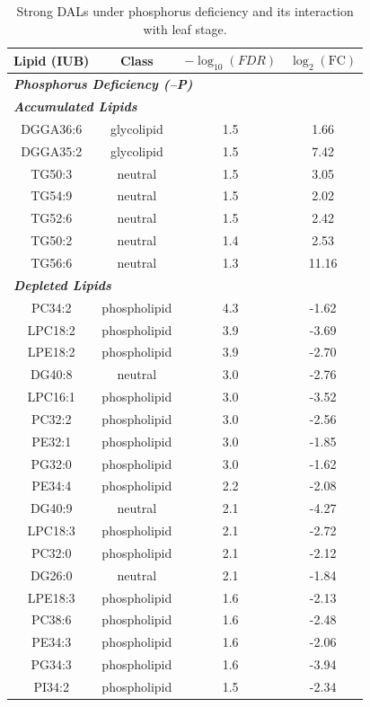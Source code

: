 \documentclass[9pt,twocolumn,twoside]{rilabRxiv}
\begin{document}
\begin{table}[h!]
\centering
\footnotesize
\caption{Strong DALs under phosphorus deficiency and its interaction with leaf stage.}
\label{table::phosphorus_lipids}
\begin{tabular}{cccc}
\hline
\textbf{Lipid (IUB)} & \textbf{Class} & \textbf{$-\log_{10}(\textit{FDR})$} & \textbf{$\log_2(\text{FC})$}\\
\hline
\multicolumn{4}{l}{\textit{\textbf{Phosphorus Deficiency (–P)}}} \\
\hline
\multicolumn{4}{l}{\textit{\textbf{Accumulated Lipids}}} \\
\hline
DGGA36:6 & glycolipid & 1.5 & 1.66\\
DGGA35:2 & glycolipid & 1.5 & 7.42\\
TG50:3 & neutral & 1.5 & 3.05\\
TG54:9 & neutral & 1.5 & 2.02\\
TG52:6 & neutral & 1.5 & 2.42\\
TG50:2 & neutral & 1.4 & 2.53\\
TG56:6 & neutral & 1.3 & 11.16\\
\hline
\multicolumn{4}{l}{\textit{\textbf{Depleted Lipids}}} \\
\hline
PC34:2 & phospholipid & 4.3 & -1.62\\
LPC18:2 & phospholipid & 3.9 & -3.69\\
LPE18:2 & phospholipid & 3.9 & -2.70\\
DG40:8 & neutral & 3.0 & -2.76\\
LPC16:1 & phospholipid & 3.0 & -3.52\\
PC32:2 & phospholipid & 3.0 & -2.56\\
PE32:1 & phospholipid & 3.0 & -1.85\\
PG32:0 & phospholipid & 3.0 & -1.62\\
PE34:4 & phospholipid & 2.2 & -2.08\\
DG40:9 & neutral & 2.1 & -4.27\\
LPC18:3 & phospholipid & 2.1 & -2.72\\
PC32:0 & phospholipid & 2.1 & -2.12\\
DG26:0 & neutral & 2.1 & -1.84\\
LPE18:3 & phospholipid & 1.6 & -2.13\\
PC38:6 & phospholipid & 1.6 & -2.48\\
PE34:3 & phospholipid & 1.6 & -2.06\\
PG34:3 & phospholipid & 1.6 & -3.94\\
PI34:2 & phospholipid & 1.5 & -2.34\\

\end{tabular}
\end{table}
\end{document}
